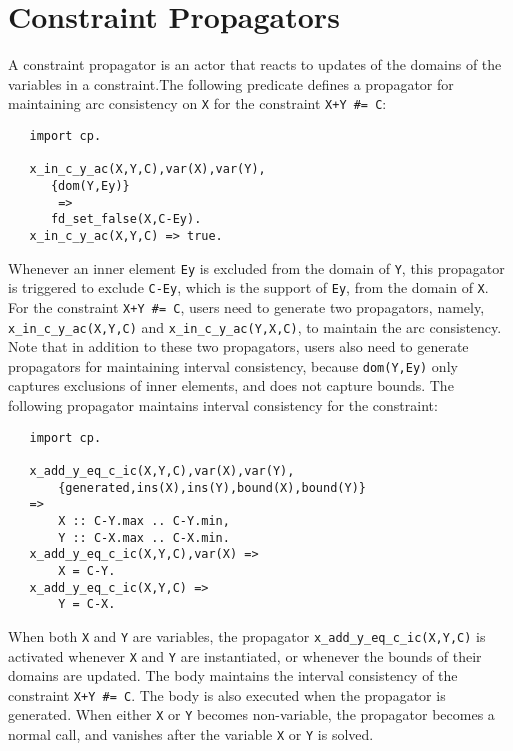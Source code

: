 \section{Constraint Propagators}
A constraint propagator is an actor that reacts to updates of the domains of the variables in a constraint.The following predicate defines a propagator for maintaining arc consistency on \texttt{X} for the constraint \verb-X+Y #= C-:
\begin{verbatim}
   import cp.

   x_in_c_y_ac(X,Y,C),var(X),var(Y),
      {dom(Y,Ey)}
       =>         
      fd_set_false(X,C-Ey).
   x_in_c_y_ac(X,Y,C) => true.
\end{verbatim}
Whenever an inner element \texttt{Ey} is excluded from the domain of \texttt{Y}, this propagator is triggered to exclude \texttt{C-Ey}, which is the support of \texttt{Ey}, from the domain of \texttt{X}. For the constraint \verb-X+Y #= C-, users need to generate two propagators, namely, \texttt{x\_in\_c\_y\_ac(X,Y,C)} and \texttt{x\_in\_c\_y\_ac(Y,X,C)}, to maintain the arc consistency. Note that in addition to these two propagators, users also need to generate propagators for maintaining interval consistency, because \texttt{dom(Y,Ey)} only captures exclusions of inner elements, and does not capture bounds. The following propagator maintains interval consistency for the constraint:
\begin{verbatim}
   import cp.

   x_add_y_eq_c_ic(X,Y,C),var(X),var(Y),
       {generated,ins(X),ins(Y),bound(X),bound(Y)}
   =>         
       X :: C-Y.max .. C-Y.min,
       Y :: C-X.max .. C-X.min.
   x_add_y_eq_c_ic(X,Y,C),var(X) =>
       X = C-Y.
   x_add_y_eq_c_ic(X,Y,C) =>
       Y = C-X.
\end{verbatim}
When both \texttt{X} and \texttt{Y} are variables, the propagator \texttt{x\_add\_y\_eq\_c\_ic(X,Y,C)} is activated whenever \texttt{X} and \texttt{Y} are instantiated, or whenever the bounds of their domains are updated. The body maintains the interval consistency of the constraint \verb-X+Y #= C-. The body is also executed when the propagator is generated. When either \texttt{X} or \texttt{Y} becomes non-variable, the propagator becomes a normal call, and vanishes after the variable \texttt{X} or \texttt{Y} is solved.

